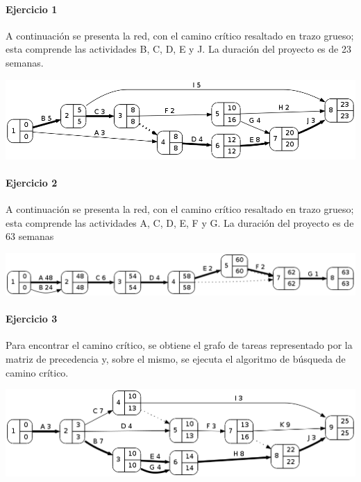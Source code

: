 \documentclass[a4paper,10pt]{article}
\begin{document}
\paragraph{Ejercicio 1} A continuación se presenta la red, con el camino crítico resaltado en trazo grueso; esta comprende las actividades B, C, D, E y J. La duración del proyecto es de 23 semanas.

    \begin{center}
	\includegraphics[scale=0.4,keepaspectratio=true]{img/ej1-red.png} 
	\end{center}

\paragraph{Ejercicio 2} A continuación se presenta la red, con el camino crítico resaltado en trazo grueso; esta comprende las actividades A, C, D, E, F y G. La duración del proyecto es de 63 semanas %

    \begin{center}
      \includegraphics[scale=0.4]{img/ej2.png}
    \end{center}

\paragraph{Ejercicio 3}
  Para encontrar el camino crítico, se obtiene el grafo de tareas representado por la matriz de precedencia y, sobre el mismo, se ejecuta el algoritmo de búsqueda de camino crítico.

  \begin{center}
    \includegraphics[scale=0.4,keepaspectratio=true]{img/ej3-0.png} 
  \end{center}
\end{document}
